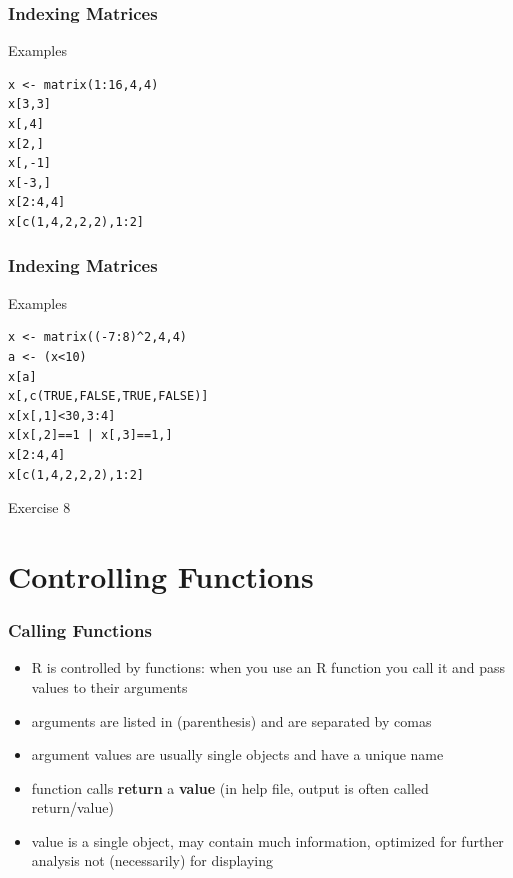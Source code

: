 \documentclass[xcolor={svgnames},10pt,
handout
]{beamer}
\begin{document}
\begin{frame}[fragile]
\frametitle{Indexing Matrices}
Examples
\begin{lstlisting}
x <- matrix(1:16,4,4)
x[3,3]
x[,4]
x[2,]
x[,-1]
x[-3,]
x[2:4,4]
x[c(1,4,2,2,2),1:2]
\end{lstlisting}
\end{frame}


\begin{frame}[fragile]
\frametitle{Indexing Matrices}
Examples
\begin{lstlisting}
x <- matrix((-7:8)^2,4,4)
a <- (x<10)
x[a]
x[,c(TRUE,FALSE,TRUE,FALSE)]
x[x[,1]<30,3:4]
x[x[,2]==1 | x[,3]==1,]
x[2:4,4]
x[c(1,4,2,2,2),1:2]
\end{lstlisting}
\end{frame}

\begin{frame}[standout]
Exercise 8
\end{frame}


\section{Controlling Functions}

\begin{frame}[fragile]\frametitle{Calling Functions}
\begin{itemize}
	\item R is controlled by functions: when you use an R function you call it and pass values to their arguments
	\item arguments are listed in (parenthesis) and are separated by comas
	\item argument values are usually single objects and have a unique name
	\item function calls \textbf{return} a \textbf{value} (in help file, output is often called return/value)
	\item value is a single object, may contain much information, optimized for further analysis not (necessarily) for displaying
\end{itemize}
\end{frame}
\end{document}
